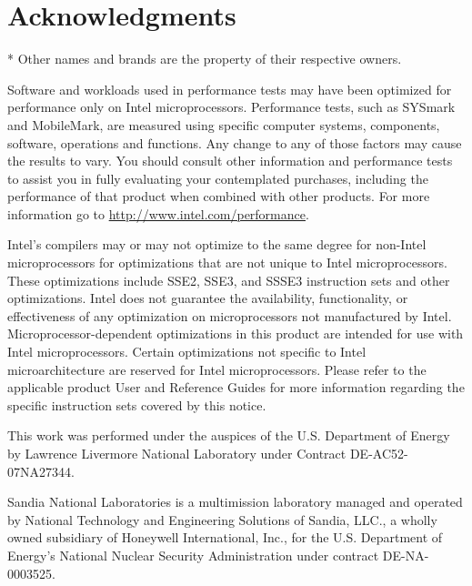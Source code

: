 \section*{Acknowledgments}

* Other names and brands are the property of their respective owners.

Software and workloads used in performance tests may have been
optimized for performance only on Intel microprocessors.  Performance
tests, such as SYSmark and MobileMark, are measured using specific
computer systems, components, software, operations and functions.  Any
change to any of those factors may cause the results to vary.  You
should consult other information and performance tests to assist you
in fully evaluating your contemplated purchases, including the
performance of that product when combined with other products.  For
more information go to \url{http://www.intel.com/performance}.

Intel's compilers may or may not optimize to the same degree for
non-Intel microprocessors for optimizations that are not unique to
Intel microprocessors. These optimizations include SSE2, SSE3, and
SSSE3 instruction sets and other optimizations. Intel does not
guarantee the availability, functionality, or effectiveness of any
optimization on microprocessors not manufactured by
Intel. Microprocessor-dependent optimizations in this product are
intended for use with Intel microprocessors. Certain optimizations not
specific to Intel microarchitecture are reserved for Intel
microprocessors. Please refer to the applicable product User and
Reference Guides for more information regarding the specific
instruction sets covered by this notice.

This work was performed under the auspices of the U.S. Department of Energy by
Lawrence Livermore National Laboratory under Contract DE-AC52-07NA27344.


Sandia National Laboratories is a multimission laboratory managed
and operated by National Technology and Engineering Solutions of
Sandia, LLC., a wholly owned subsidiary of Honeywell International,
Inc., for the U.S. Department of Energy's National Nuclear Security
Administration under contract DE-NA-0003525.

